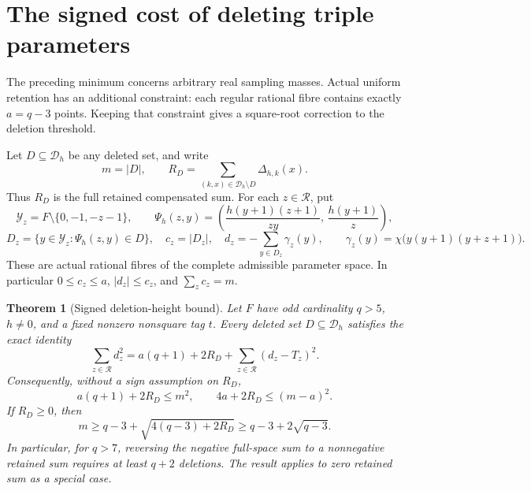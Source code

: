 \documentclass[11pt]{article}
\newtheorem{theorem}{Theorem}[section]
\begin{document}
\section{The signed cost of deleting triple parameters}

The preceding minimum concerns arbitrary real sampling masses. Actual
uniform retention has an additional constraint: each regular rational
fibre contains exactly \(a=q-3\) points. Keeping that constraint gives
a square-root correction to the deletion threshold.

Let \(D\subseteq\mathcal D_h\) be any deleted set, and write
\[
 m=|D|,\qquad
 R_D=\sum_{(k,x)\in\mathcal D_h\setminus D}\Delta_{h,k}(x).
\]
Thus \(R_D\) is the full retained compensated sum. For each
\(z\in\mathcal R\), put
\[
 \mathcal Y_z=F\setminus\{0,-1,-z-1\},\qquad
 \Psi_h(z,y)=
 \left(\frac{h(y+1)(z+1)}{zy},\,\frac{h(y+1)}z\right),
\]
\[
 D_z=\{y\in\mathcal Y_z:\Psi_h(z,y)\in D\},\quad
 c_z=|D_z|,\quad
 d_z=-\sum_{y\in D_z}\gamma_z(y),\qquad
 \gamma_z(y)=\chi\bigl(y(y+1)(y+z+1)\bigr).
\]
These are actual rational fibres of the complete admissible parameter
space. In particular \(0\le c_z\le a\), \(|d_z|\le c_z\), and
\(\sum_z c_z=m\).

\begin{theorem}[Signed deletion-height bound]\label{thm:tripleSignedDeletion}
Let \(F\) have odd cardinality \(q>5\), \(h\ne0\), and a fixed
nonzero nonsquare tag \(t\). Every deleted set \(D\subseteq\mathcal D_h\)
satisfies the exact identity
\[
 \boxed{\quad
 \sum_{z\in\mathcal R}d_z^2
 =a(q+1)+2R_D+\sum_{z\in\mathcal R}(d_z-T_z)^2 .
 \quad} \tag{DP}
\]
Consequently, without a sign assumption on \(R_D\),
\[
 a(q+1)+2R_D\le m^2,\qquad
 4a+2R_D\le(m-a)^2. \tag{DC}
\]
If \(R_D\ge0\), then
\[
 \boxed{\quad m\ge q-3+\sqrt{4(q-3)+2R_D}
                    \ge q-3+2\sqrt{q-3}.\quad} \tag{DH}
\]
In particular, for \(q>7\), reversing the negative full-space sum to
a nonnegative retained sum requires at least \(q+2\) deletions.
The result applies to zero retained sum as a special case.
\end{theorem}
\end{document}
